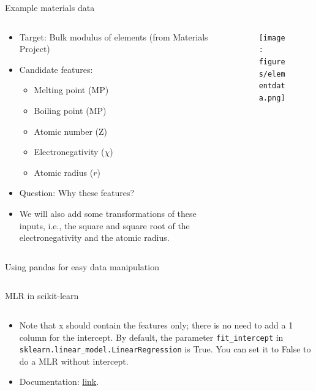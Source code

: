 \documentclass[aspectratio=169]{beamer}
\begin{document}
\begin{frame}{Example materials data}
    \begin{columns}
    \begin{column}{0.7\textwidth}
        \begin{itemize}
            \item Target: Bulk modulus of elements (from Materials Project)
            \item Candidate features:
            \begin{itemize}
                \item Melting point (MP)
                \item Boiling point (MP)
                \item Atomic number (Z)
                \item Electronegativity ($\chi$)
                \item Atomic radius ($r$)
            \end{itemize}
            \item Question: Why these features?
            \item We will also add some transformations of these inputs, i.e., the square and square root of the electronegativity and the atomic radius.
    \end{itemize}
    \end{column}
    \begin{column}{0.3\textwidth}
        \begin{figure}
        \centering
        \texttt{[image: figures/elementdata.png]}
    \end{figure}
    \end{column}
\end{columns}
\end{frame}


\begin{frame}[fragile]{Using pandas for easy data manipulation}
    \inputminted{python}{example_pandas_data_manipulation.py}
\end{frame}


\begin{frame}[fragile]{MLR in scikit-learn}
\inputminted{python}{example_sklearn_mlr.py}
\begin{itemize}
    \item Note that x should contain the features only; there is no need to add a 1 column for the intercept. By default, the parameter \texttt{fit\_intercept} in \texttt{sklearn.linear\_model.LinearRegression} is True. You can set it to False to do a MLR without intercept.
    \item Documentation: \href{https://scikit-learn.org/stable/modules/generated/sklearn.linear_model.LinearRegression.html}{link}.
\end{itemize}

\end{frame}
\end{document}

